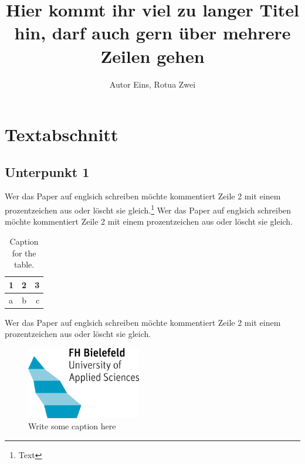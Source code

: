 \documentclass[12pt,twocolumn,twoside]{conference}
\title{Hier kommt ihr viel zu langer Titel hin, darf auch gern über mehrere Zeilen gehen}
\author{Autor Eins, Rotua Zwei}
\begin{document}
\section{Textabschnitt}
\subsection{Unterpunkt 1}
Wer das Paper auf englsich schreiben möchte kommentiert Zeile 2 mit einem prozentzeichen aus oder löscht sie gleich.\footnote{Text} Wer das Paper auf englsich schreiben möchte kommentiert Zeile 2 mit einem prozentzeichen aus oder löscht sie gleich.

\begin{table}[!h]
  \centering 
  \label{tab:table1}
  \begin{tabular}{l|c||r}
    1 & 2 & 3\\
    \hline
    a & b & c\\
  \end{tabular}
  \caption{Caption for the table.}
\end{table}

Wer das Paper auf englsich schreiben möchte kommentiert Zeile 2 mit einem prozentzeichen aus oder löscht sie gleich.

\begin{figure}[H]
\centering
\includegraphics[width=5cm]{fhbielefeld_logo.png}
\caption{Write some caption here}\label{visina8}
\vspace{-12pt}
\end{figure}
\end{document}
